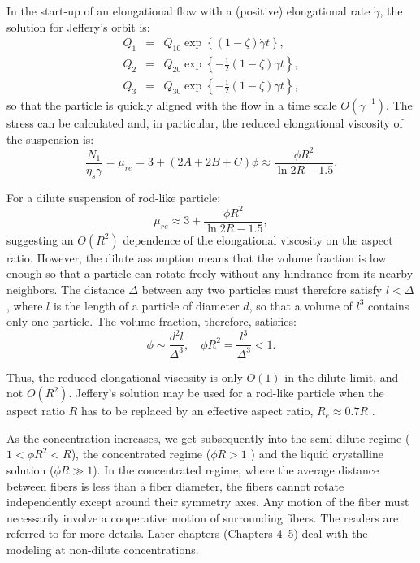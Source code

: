 \documentclass[english,fleqn,allpages]{ISTE_science}[2018/07/30]
\begin{document}
In the start-up of an elongational flow with a (positive) elongational
rate $\dot{\gamma}$, the solution for Jeffery's orbit is: 
\begin{eqnarray}
Q_{1} & =&Q_{10}\exp\left\{ (1-\zeta)\dot{\gamma}t\right\} ,\nonumber \\
Q_{2} & =&Q_{20}\exp\left\{ -\frac{1}{2}(1-\zeta)\dot{\gamma}t\right\} ,\\
Q_{3} & =&Q_{30}\exp\left\{ -\frac{1}{2}(1-\zeta)\dot{\gamma}t\right\} ,\nonumber 
\end{eqnarray}
so that the particle is quickly aligned with the flow in a time scale
$O(\dot{\gamma}^{-1})$. The stress can be calculated and, in particular,
the reduced elongational viscosity of the suspension is:
\begin{equation}
\frac{N_{1}}{\eta_{s}\dot{\gamma}}=\mu_{re}=3+\left(2A+2B+C\right)\phi\approx\frac{\phi R^{2}}{\ln2R-1.5}.\label{8.21}
\end{equation}

For a dilute suspension of rod-like particle:
\begin{equation}
\mu_{re}\approx3+\frac{\phi R^{2}}{\ln2R-1.5},
\end{equation}
suggesting an $O\left(R^{2}\right)$ dependence of the elongational
viscosity on the aspect ratio. However, the dilute assumption means
that the volume fraction is low enough so that a particle can rotate
freely without any hindrance from its nearby neighbors. The distance
$\Delta$ between any two particles must therefore satisfy $l<\Delta$,
where $l$ is the length of a particle of diameter $d$, so that a
volume of $l^{3}$ contains only one particle. The volume fraction,
therefore, satisfies: 
\[
\phi\sim\frac{d^{2}l}{\Delta^{3}},\quad\phi R^{2}=\frac{l^{3}}{\Delta^{3}}<1.
\]

Thus, the reduced elongational viscosity is only $O(1)$ in the dilute
limit, and not $O(R^{2})$. Jeffery's solution may be used for a rod-like
particle when the aspect ratio $R$ has to be replaced by an effective
aspect ratio, $R_{e}\approx0.7R$ \cite{cox71}.

As the concentration increases, we get subsequently into the semi-dilute
regime ($1<\phi R^{2}<R$), the concentrated regime ($\phi R>1$ )
and the liquid crystalline solution ($\phi R\gg1$). In the concentrated
regime, where the average distance between fibers is less than a fiber
diameter, the fibers cannot rotate independently except around their
symmetry axes. Any motion of the fiber must necessarily involve a
cooperative motion of surrounding fibers. The readers are referred
to \cite{doi88} for more details. Later chapters (Chapters 4--5) deal with
the modeling at non-dilute concentrations.
\end{document}
